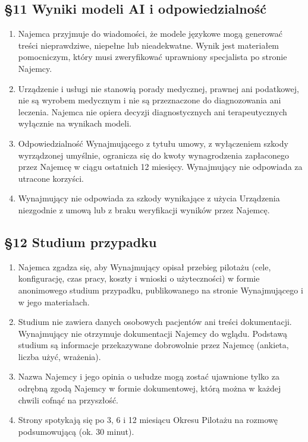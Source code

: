\documentclass[11pt,a4paper]{article}
\begin{document}
\subsection*{§11 Wyniki modeli AI i odpowiedzialność}
\begin{enumerate}
\item Najemca przyjmuje do wiadomości, że modele językowe mogą generować treści nieprawdziwe, niepełne lub nieadekwatne. Wynik jest materiałem pomocniczym, który musi zweryfikować uprawniony specjalista po stronie Najemcy.
\item Urządzenie i usługi nie stanowią porady medycznej, prawnej ani podatkowej, nie są wyrobem medycznym i nie są przeznaczone do diagnozowania ani leczenia. Najemca nie opiera decyzji diagnostycznych ani terapeutycznych wyłącznie na wynikach modeli.
\item Odpowiedzialność Wynajmującego z tytułu umowy, z wyłączeniem szkody wyrządzonej umyślnie, ogranicza się do kwoty wynagrodzenia zapłaconego przez Najemcę w ciągu ostatnich 12 miesięcy. Wynajmujący nie odpowiada za utracone korzyści.
\item Wynajmujący nie odpowiada za szkody wynikające z użycia Urządzenia niezgodnie z umową lub z braku weryfikacji wyników przez Najemcę.
\end{enumerate}

\subsection*{§12 Studium przypadku}
\begin{enumerate}
\item Najemca zgadza się, aby Wynajmujący opisał przebieg pilotażu (cele, konfigurację, czas pracy, koszty i wnioski o użyteczności) w formie anonimowego studium przypadku, publikowanego na stronie Wynajmującego i w jego materiałach.
\item Studium nie zawiera danych osobowych pacjentów ani treści dokumentacji. Wynajmujący nie otrzymuje dokumentacji Najemcy do wglądu. Podstawą studium są informacje przekazywane dobrowolnie przez Najemcę (ankieta, liczba użyć, wrażenia).
\item Nazwa Najemcy i jego opinia o usłudze mogą zostać ujawnione tylko za odrębną zgodą Najemcy w formie dokumentowej, którą można w każdej chwili cofnąć na przyszłość.
\item Strony spotykają się po 3, 6 i 12 miesiącu Okresu Pilotażu na rozmowę podsumowującą (ok. 30 minut).
\end{enumerate}
\end{document}
